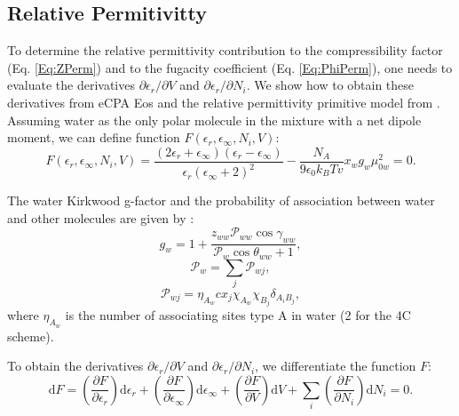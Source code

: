 \subsection{Relative Permitivitty}
To determine the relative permittivity contribution to the compressibility factor (Eq. \ref{Eq:ZPerm}) and to the fugacity coefficient (Eq. \ref{Eq:PhiPerm}), one needs to evaluate the derivatives $\partial \epsilon_r / \partial V$ and $\partial \epsilon_r / \partial N_i$. We show how to obtain these derivatives from eCPA Eos and the relative permittivity primitive model from \citeauthor{Maribo2013a} \cite{Maribo2013}.  Assuming water as the only polar molecule in the mixture with a net dipole moment, we can define function $F\left (  \epsilon_r, \epsilon_\infty, N_i, V \right )$:
\begin{equation}
        F\left (  \epsilon_r, \epsilon_\infty, N_i, V \right ) = \frac{\left (2\epsilon_r + \epsilon_\infty \right ) \left ( \epsilon_r - \epsilon_\infty \right )}{\epsilon_r\left ( \epsilon_\infty + 2 \right )^2} - \frac{N_A}{9\epsilon_0k_BTv}x_wg_w\mu_{0w}^2 =0.
        \label{Eqeps_simp}
\end{equation} 

The water Kirkwood g-factor and the probability of association between water and other molecules are given by \cite{Maribo2013}: 
\begin{equation}
        g_w = 1 + \frac{z_{ww}\mathcal{P}_{ww}\cos{\gamma_{ww}}}{\mathcal{P}_{w} \cos{\theta_{ww}+1}},
        \label{Kirkwood_simp}
\end{equation} 
\begin{equation}
        \mathcal{P}_{w} = \sum_j \mathcal{P}_{wj},
        \label{Prob_association_total}
\end{equation} 
\begin{equation}
        \mathcal{P}_{wj} = \eta_{A_w}c x_j\chi_{A_w} \chi_{B_j} \delta_{A_iB_j},
        \label{P_wj}
\end{equation} 
where $\eta_{A_w}$ is the number of associating sites type A in water (2 for the 4C scheme).

To obtain the derivatives $\partial \epsilon_r / \partial V$ and $\partial \epsilon_r / \partial N_i$, we differentiate the function $F$: 
\begin{equation}
        \mathrm{d} F = \left ( \frac{\partial F}{\partial \epsilon_r} \right )\mathrm{d}\epsilon_r + \left ( \frac{\partial F}{\partial \epsilon_\infty} \right )\mathrm{d}\epsilon_\infty + \left ( \frac{\partial F}{\partial V} \right )\mathrm{d}V + \sum_i\left ( \frac{\partial F}{\partial N_i} \right )\mathrm{d}N_i = 0.
        \label{Ffunction}
\end{equation} 


